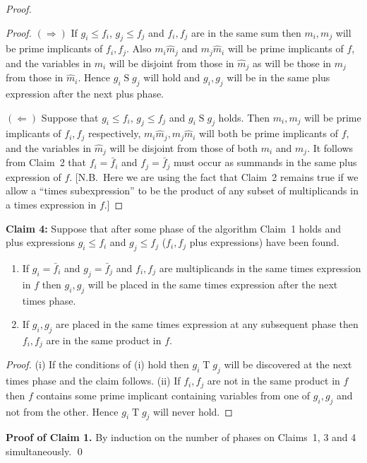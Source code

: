 \begin{proof}
\begin{proof}
$(\Rightarrow)$ If $g_i \leq f_i$, $g_j \leq f_j$ and $f_i, f_j$ are in the same sum then $m_i, m_j$ will be prime implicants of $f_i, f_j$. Also $m_i \hat{m}_j$ and $m_j \hat{m}_i$ will be prime implicants of $f$, and the variables in $m_i$ will be disjoint from those in $\hat{m}_j$ as will be those in $m_j$ from those in $\hat{m}_i$. Hence $g_i \mathrel{S} g_j$ will hold and $g_i, g_j$ will be in the same plus expression after the next plus phase.

$(\Leftarrow)$ Suppose that $g_i \leq f_i$, $g_j \leq f_j$ and $g_i \mathrel{S} g_j$ holds. Then $m_i, m_j$ will be prime implicants of $f_i, f_j$ respectively, $m_i \hat{m}_j, m_j \hat{m}_i$ will both be prime implicants of $f$, and the variables in $\hat{m}_j$ will be disjoint from those of both $m_i$ and $m_j$. It follows from Claim~2 that $f_i = \bar{f}_i$ and $f_j = \bar{f}_j$ must occur as summands in the same plus expression of $f$. [N.B.\ Here we are using the fact that Claim~2 remains true if we allow a ``times subexpression'' to be the product of any subset of multiplicands in a times expression in $f$.]
\end{proof}

\textbf{Claim 4:} Suppose that after some phase of the algorithm Claim~1 holds and plus expressions $g_i \leq f_i$ and $g_j \leq f_j$ ($f_i, f_j$ plus expressions) have been found.
\begin{enumerate}
    \item[(i)] If $g_i = \bar{f}_i$ and $g_j = \bar{f}_j$ and $f_i, f_j$ are multiplicands in the same times expression in $f$ then $g_i, g_j$ will be placed in the same times expression after the next times phase.
    \item[(ii)] If $g_i, g_j$ are placed in the same times expression at any subsequent phase then $f_i, f_j$ are in the same product in $f$.
\end{enumerate}

\begin{proof}
(i) If the conditions of (i) hold then $g_i \mathrel{T} g_j$ will be discovered at the next times phase and the claim follows. (ii) If $f_i, f_j$ are not in the same product in $f$ then $f$ contains some prime implicant containing variables from one of $g_i, g_j$ and not from the other. Hence $g_i \mathrel{T} g_j$ will never hold. \qedhere
\end{proof}

\textbf{Proof of Claim 1.} By induction on the number of phases on Claims~1, 3 and 4 simultaneously. \qed


\end{proof}
